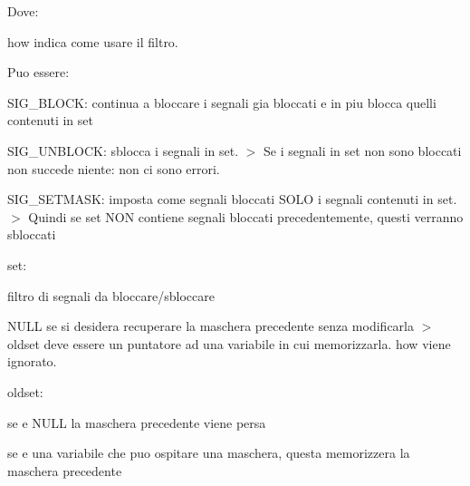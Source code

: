 Dove\+:
\begin{DoxyItemize}
\item {\ttfamily how} indica come usare il filtro.

Puo\textquotesingle{} essere\+:
\begin{DoxyItemize}
\item {\ttfamily S\+I\+G\+\_\+\+B\+L\+O\+CK}\+: continua a bloccare i segnali gia\textquotesingle{} bloccati e in piu\textquotesingle{} blocca quelli contenuti in {\ttfamily set}
\item {\ttfamily S\+I\+G\+\_\+\+U\+N\+B\+L\+O\+CK}\+: sblocca i segnali in {\ttfamily set}. $>$ Se i segnali in {\ttfamily set} non sono bloccati non succede niente\+: non ci sono errori.
\item {\ttfamily S\+I\+G\+\_\+\+S\+E\+T\+M\+A\+SK}\+: imposta come segnali bloccati S\+O\+LO i segnali contenuti in {\ttfamily set}. $>$ Quindi se {\ttfamily set} N\+ON contiene segnali bloccati precedentemente, questi verranno sbloccati
\end{DoxyItemize}
\item {\ttfamily set}\+:
\begin{DoxyItemize}
\item filtro di segnali da bloccare/sbloccare
\item N\+U\+LL se si desidera recuperare la maschera precedente senza modificarla $>$ {\ttfamily oldset} deve essere un puntatore ad una variabile in cui memorizzarla. {\ttfamily how} viene ignorato.
\end{DoxyItemize}
\item {\ttfamily oldset}\+:
\begin{DoxyItemize}
\item se e\textquotesingle{} N\+U\+LL la maschera precedente viene persa
\item se e\textquotesingle{} una variabile che puo\textquotesingle{} ospitare una maschera, questa memorizzera\textquotesingle{} la maschera precedente
\end{DoxyItemize}
\end{DoxyItemize}

